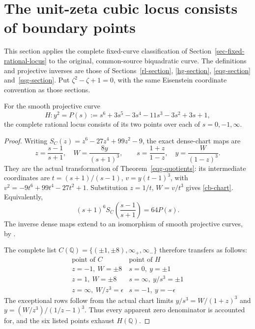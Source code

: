 \section{The unit-zeta cubic locus consists of boundary points}
\label{cb19-section}

This section applies the complete fixed-curve classification of
Section~\ref{sec-fixed-rational-locus} to the original, common-source
biquadratic curve. The definitions and projective inverses are those
of Sections~\ref{rl-section}, \ref{hg-section}, \ref{eqg-section}
and~\ref{ssg-section}. Put \(\zeta^2-\zeta+1=0\), with the same
Eisenstein coordinate convention as those sections.

\begin{proposition}
\label{cb-first-quotient}
For the smooth projective curve
\[
 H:y^2=P(s):=s^6+3s^5-3s^4-11s^3-3s^2+3s+1,
\]
the complete rational locus consists of its two points over each of
\(s=0,-1,\infty\).
\end{proposition}
\begin{proof}
Writing \(S_C(z)=z^6-27z^4+99z^2-9\), the exact dense-chart maps are
\begin{equation}
 z=\frac{s-1}{s+1},\quad W=\frac{8y}{(s+1)^3},\qquad
 s=\frac{1+z}{1-z},\quad y=\frac W{(1-z)^3}.
 \label{cb-chart}
\end{equation}
They are the actual transformation of Theorem~\ref{eqg-quotients}:
its intermediate coordinates are
\(t=(s+1)/(s-1)\), \(v=y(t-1)^3\), with
\(v^2=-9t^6+99t^4-27t^2+1\). Substitution \(z=1/t\),
\(W=v/t^3\) gives \eqref{cb-chart}. Equivalently,
\[
 (s+1)^6S_C\left(\frac{s-1}{s+1}\right)=64P(s).
\]
The inverse dense maps extend to an isomorphism of smooth projective
curves, by \cite[Lemmas~53.2.2 and 53.2.6]{StacksCurves2026}.

The complete list
\(C(\mathbb Q)=\{(\pm1,\pm8),\infty_+,\infty_-\}\)
therefore transfers as follows:
\[
\begin{array}{c|c}
 \text{point of }C&\text{point of }H\\\hline
 z=-1,\ W=\pm8&s=0,\ y=\pm1\\
 z=1,\ W=\pm8&s=\infty,\ y/s^3=\pm1\\
 z=\infty,\ W/z^3=\epsilon&s=-1,\ y=-\epsilon
\end{array}
\]
The exceptional rows follow from the actual chart limits
\(y/s^3=W/(1+z)^3\) and
\(y=(W/z^3)/(1/z-1)^3\). Thus every apparent zero denominator is
accounted for, and the six listed points exhaust \(H(\mathbb Q)\).
\end{proof}

